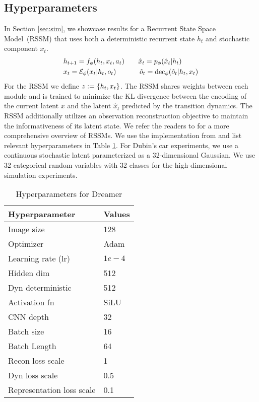 
\subsection{Hyperparameters}

In Section \ref{sec:sim}, we showcase results for a Recurrent State Space Model~(RSSM) \cite{hafner2019learning} that uses both a deterministic recurrent state $h_t$ and stochastic component $x_t$.
\begin{equation}
\begin{aligned}
    &h_{t+1} = f_{\phi}(h_{t}, x_{t}, a_{t}) \;\;\;\;\;\;\;
    \hat{x}_t = p_\phi(\hat{x}_t | h_t) \\
        &x_{t} = \mathcal{E}_\phi(x_{t} | h_t, o_t) \;\;\;\;\;\;\;\;\;\;\;\; \hat{o}_t = \text{dec}_\phi(\hat{o}_t | h_t, x_t)
\end{aligned}
 \end{equation}
 For the RSSM we define $z := \{h_t, x_t \}$.
 The RSSM shares weights between each module and is trained to minimize the KL divergence between the encoding of the current latent $x$ and the latent $\hat{x}_t$ predicted by the transition dynamics. The RSSM additionally utilizes an observation reconstruction objective to maintain the informativeness of its latent state. We refer the readers to \cite{hafner2019learning, hafner2020dreamerv2, hafner2024masteringdiversedomainsworld} for a more comprehensive overview of RSSMs. We use the implementation from \cite{dreamerv3-torch} and list relevant hyperparameters in Table \ref{tab:dreamer}. For Dubin's car experiments, we use a continuous stochastic latent parameterized as a 32-dimensional Gaussian. We use 32 categorical random variables with 32 classes for the high-dimensional simulation experiments.
\begin{table}[h]
    \centering
    \begin{tabular}{l l}
        \toprule
        \textbf{Hyperparameter} & \textbf{Values}  \\
        \midrule
        Image size & 128 \\
        Optimizer & Adam \\
        Learning rate (lr) & $1e-4$ \\
        Hidden dim & 512 \\ 
        Dyn deterministic  & 512 \\
        Activation fn & SiLU \\
        CNN depth & 32 \\
        Batch size & 16 \\
        Batch Length & 64 \\
        Recon loss scale & 1 \\
        Dyn loss scale & 0.5 \\
        Representation loss scale & 0.1 \\ 
    \bottomrule
    \end{tabular}
    \caption{Hyperparameters for Dreamer}
    \label{tab:dreamer}
\end{table}

